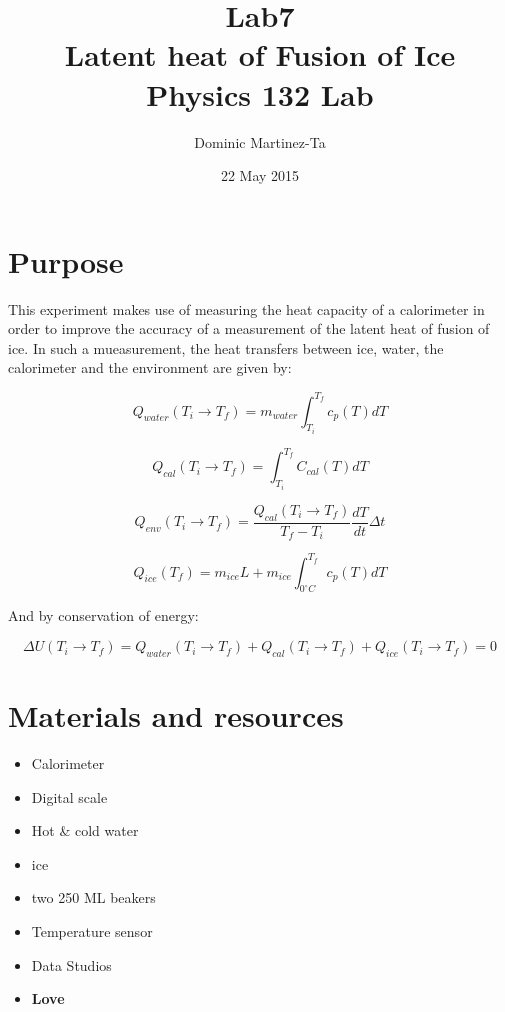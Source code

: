 \documentclass[12pt]{report}
\begin{document}
\title{Lab7 \\ Latent heat of Fusion of Ice \\ Physics 132 Lab}
\author{Dominic Martinez-Ta}
\date{22 May 2015}
\maketitle


\section{Purpose}
	
	This experiment makes use of measuring the heat capacity of a calorimeter in order to improve the accuracy of a measurement of the latent heat of fusion of ice. In such a mueasurement, the heat transfers between ice, water, the calorimeter and the environment are given by:


\begin{equation}
Q_{water}(T_i \rightarrow T_f) = m_{water}\int_{T_i}^{T_f} c_p(T) dT
\end{equation}

\begin{equation}
Q_{cal}(T_i \rightarrow T_f) = \int_{T_i}^{T_f} C_{cal}(T) dT
\end{equation}

\begin{equation}
Q_{env}(T_i \rightarrow T_f) = \frac{Q_{cal}(T_i \rightarrow T_f)}{T_f - T_i} \frac{dT}{dt} \Delta t
\end{equation}

\begin{equation}
Q_{ice}(T_f) = m_{ice}L + m_{ice}\int_{0^{\circ} C}^{T_f} c_p(T) dT
\end{equation}


And by conservation of energy: 

\begin{equation}
\Delta U (T_i \rightarrow T_f) = Q_{water}(T_i \rightarrow T_f) + Q_{cal}(T_i \rightarrow T_f) + Q_{ice}(T_i \rightarrow T_f) = 0
\end{equation}

\section {Materials and resources}

\begin{itemize}
	\item Calorimeter
	\item Digital scale
	\item Hot \& cold water
	\item ice
	\item two 250 ML beakers
	\item Temperature sensor
	\item Data Studios
	\item \textbf{Love}
\end{itemize}
\end{document}
